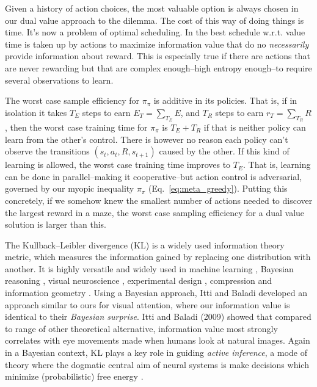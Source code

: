 \documentclass[9pt,twocolumn,twoside]{pnas-new}
\begin{document}
Given a history of action choices, the most valuable option is always chosen in our dual value approach to the dilemma. The cost of this way of doing things is time. It's now a problem of optimal scheduling. In the best schedule w.r.t. value time is taken up by actions to maximize information value that do no \textit{necessarily} provide information about reward. This is especially true if there are actions that are never rewarding but that are complex enough--high entropy enough--to require several observations to learn. 

The worst case sample efficiency for $\pi_{\pi}$ is additive in its policies. That is, if in isolation it takes $T_E$ steps to earn $E_{T} = \sum_{T_E} E$, and $T_R$ steps to earn $r_{T} = \sum_{T_R} R$, then the worst case training time for $\pi_{\pi}$ is $T_E + T_R$ if that is neither policy can learn from the other's control. There is however no reason each policy can't observe the transitions $(s_t, a_t, R, s_{t+1})$ caused by the other. If this kind of learning is allowed, the worst case training time improves to $T_E$. That is, learning can be done in parallel--making it cooperative--but action control is adversarial, governed by our myopic inequality $\pi_{\pi}$ (Eq.~\ref{eq:meta_greedy}). Putting this concretely, if we somehow knew the smallest number of actions needed to discover the largest reward in a maze, the worst case sampling efficiency for a dual value solution is larger than this.

The Kullback--Leibler divergence (KL) is a widely used information theory metric, which measures the information gained by replacing one distribution with another. It is highly versatile and widely used in machine learning \cite{Goodfellow-et-al-2016}, Bayesian reasoning \cite{Itti2009,Friston2016}, visual neuroscience \cite{Itti2009}, experimental design \cite{Lopez-Fidalgo2007}, compression \cite{Mackay,Still2012} and information geometry \cite{Ay2015}. Using a Bayesian approach, Itti and Baladi \citep{Itti2009} developed an approach similar to ours for visual attention, where our information value is identical to their \textit{Bayesian surprise}. Itti and Baladi (2009) showed that compared to range of other theoretical alternative, information value most strongly correlates with eye movements made when humans look at natural images. Again in a Bayesian context, KL plays a key role in guiding \textit{active inference}, a mode of theory where the dogmatic central aim of neural systems is make decisions which minimize (probabilistic) free energy \cite{Friston2016,Schwartenbeck2019}. 
\end{document}
